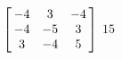 {$\left[\hskip -3pt \begin{array}{ccc} -4&3&-4\\  -4&-5&3
\\  3&-4&5\end{array}\hskip -3pt \right]$} 
{$15$}

  

 

